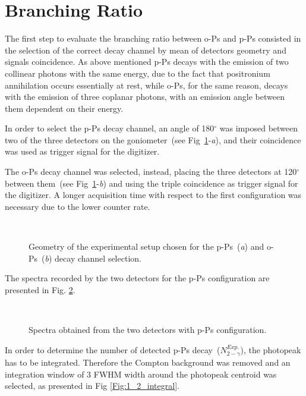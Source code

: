 \section*{Branching Ratio}

The first step to evaluate the branching ratio between o-Ps and p-Ps consisted in the selection of the correct decay channel by mean of detectors geometry and signals coincidence.
As above mentioned p-Ps decays with the emission of two collinear photons with the same energy, due to the fact that positronium annihilation occurs essentially at rest, while o-Ps, for the same reason, decays with the emission of three coplanar photons, with an emission angle between them dependent on their energy.

In order to select the p-Ps decay channel, an angle of 180$^\circ$ was imposed between two of the three detectors on the goniometer~(see Fig~\ref{Fig:PsGeometry}-\emph{a}), and their coincidence was used as trigger signal for the digitizer. 

The o-Ps decay channel was selected, instead, placing the three detectors at 120$^\circ$ between them~(see Fig~\ref{Fig:PsGeometry}-\emph{b}) and using the triple coincidence as trigger signal for the digitizer. A longer acquisition time with respect to the first configuration was necessary due to the lower counter rate.

 
\begin{figure}[h!]
	\centering
	 \quad
		 \\
	\caption{Geometry of the experimental setup chosen for the p-Ps~(\emph{a}) and o-Ps~(\emph{b}) decay channel selection.}
	\label{Fig:PsGeometry}
\end{figure}

The spectra recorded by the two detectors for the p-Ps configuration are presented in Fig. \ref{Fig:1_2_spectra}.

\begin{figure}[H]
	\centering
	 \quad
		 \\
	\caption{Spectra obtained from the two detectors with p-Ps configuration.}
\label{Fig:1_2_spectra}
\end{figure}
In order to determine the number of detected p-Ps decay~($N_{2-\gamma}^{Exp.}$), the photopeak has to be integrated. Therefore the Compton background was removed and an integration window of 3 FWHM width around the photopeak centroid was selected, as presented in Fig \ref{Fig:1_2_integral}.

